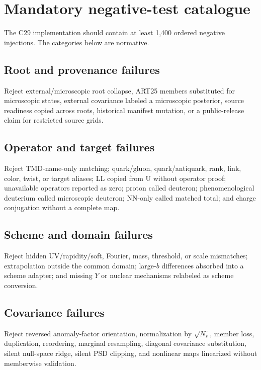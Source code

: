 \documentclass[11pt]{article}
\begin{document}
\section{Mandatory negative-test catalogue}
\label{sec:negative-tests}

The C29 implementation should contain at least 1,400 ordered negative injections.  The categories below are normative.

\subsection{Root and provenance failures}

Reject external/microscopic root collapse, ART25 members substituted for microscopic states, external covariance labeled a microscopic posterior, source readiness copied across roots, historical manifest mutation, or a public-release claim for restricted source grids.

\subsection{Operator and target failures}

Reject TMD-name-only matching; quark/gluon, quark/antiquark, rank, link, color, twist, or target aliases; LL copied from U without operator proof; unavailable operators reported as zero; proton called deuteron; phenomenological deuterium called microscopic deuteron; NN-only called matched total; and charge conjugation without a complete map.

\subsection{Scheme and domain failures}

Reject hidden UV/rapidity/soft, Fourier, mass, threshold, or scale mismatches; extrapolation outside the common domain; large-\(b\) differences absorbed into a scheme adapter; and missing \(Y\) or nuclear mechanisms relabeled as scheme conversion.

\subsection{Covariance failures}

Reject reversed anomaly-factor orientation, normalization by \(\sqrt{N_s}\), member loss, duplication, reordering, marginal resampling, diagonal covariance substitution, silent null-space ridge, silent PSD clipping, and nonlinear maps linearized without memberwise validation.
\end{document}
